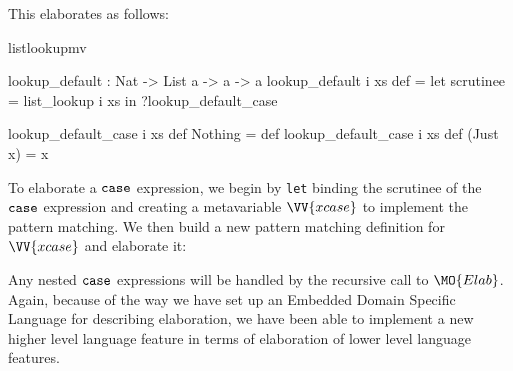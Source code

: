 
\noindent
This elaborates as follows:

\begin{SaveVerbatim}{listlookupmv}

lookup_default : Nat -> List a -> a -> a
lookup_default i xs def = 
   let scrutinee = list_lookup i xs in ?lookup_default_case

lookup_default_case i xs def Nothing  = def
lookup_default_case i xs def (Just x) = x

\end{SaveVerbatim}

To elaborate a $\mathtt{case}$ expression, we begin by \texttt{let} binding the scrutinee of
the $\mathtt{case}$ expression and creating a metavariable $\VV{xcase}$ to implement the
pattern matching. We then build a new pattern matching definition for $\VV{xcase}$
and elaborate it:


Any nested $\mathtt{case}$ expressions will be handled by the recursive call to
$\MO{Elab}$. Again, because of the way we have set up an Embedded Domain Specific
Language for describing elaboration, we have been able to implement a new higher
level language feature in terms of elaboration of lower level language features.






